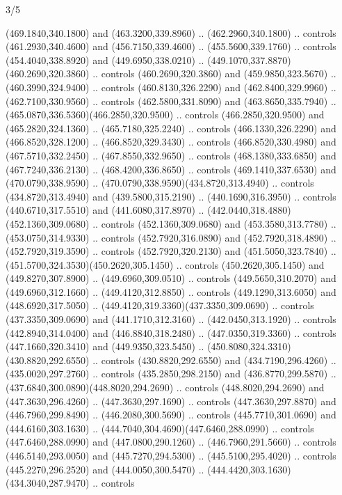 \begin{flagdescription}{3/5}
\begin{scope}[shift={(0.5\flaglength,0.5\flagwidth)},scale=\flagwidth/1075]
\begin{scope}[y=0.80pt, x=0.80pt, yscale=-2.37, xscale=2.37,xshift=-402,yshift=-230.4]
  (469.1840,340.1800) and (463.3200,339.8960) .. (462.2960,340.1800) .. controls
  (461.2930,340.4600) and (456.7150,339.4600) .. (455.5600,339.1760) .. controls
  (454.4040,338.8920) and (449.6950,338.0210) ..
  (449.1070,337.8870)(460.2690,320.3860) .. controls (460.2690,320.3860) and
  (459.9850,323.5670) .. (460.3990,324.9400) .. controls (460.8130,326.2290) and
  (462.8400,329.9960) .. (462.7100,330.9560) .. controls (462.5800,331.8090) and
  (463.8650,335.7940) .. (465.0870,336.5360)(466.2850,320.9500) .. controls
  (466.2850,320.9500) and (465.2820,324.1360) .. (465.7180,325.2240) .. controls
  (466.1330,326.2290) and (466.8520,328.1200) .. (466.8520,329.3430) .. controls
  (466.8520,330.4980) and (467.5710,332.2450) .. (467.8550,332.9650) .. controls
  (468.1380,333.6850) and (467.7240,336.2130) .. (468.4200,336.8650) .. controls
  (469.1410,337.6530) and (470.0790,338.9590) ..
  (470.0790,338.9590)(434.8720,313.4940) .. controls (434.8720,313.4940) and
  (439.5800,315.2190) .. (440.1690,316.3950) .. controls (440.6710,317.5510) and
  (441.6080,317.8970) .. (442.0440,318.4880)(452.1360,309.0680) .. controls
  (452.1360,309.0680) and (453.3580,313.7780) .. (453.0750,314.9330) .. controls
  (452.7920,316.0890) and (452.7920,318.4890) .. (452.7920,319.3590) .. controls
  (452.7920,320.2130) and (451.5050,323.7840) ..
  (451.5700,324.3530)(450.2620,305.1450) .. controls (450.2620,305.1450) and
  (449.8270,307.8900) .. (449.6960,309.0510) .. controls (449.5650,310.2070) and
  (449.6960,312.1660) .. (449.4120,312.8850) .. controls (449.1290,313.6050) and
  (448.6920,317.5050) .. (449.4120,319.3360)(437.3350,309.0690) .. controls
  (437.3350,309.0690) and (441.1710,312.3160) .. (442.0450,313.1920) .. controls
  (442.8940,314.0400) and (446.8840,318.2480) .. (447.0350,319.3360) .. controls
  (447.1660,320.3410) and (449.9350,323.5450) ..
  (450.8080,324.3310)(430.8820,292.6550) .. controls (430.8820,292.6550) and
  (434.7190,296.4260) .. (435.0020,297.2760) .. controls (435.2850,298.2150) and
  (436.8770,299.5870) .. (437.6840,300.0890)(448.8020,294.2690) .. controls
  (448.8020,294.2690) and (447.3630,296.4260) .. (447.3630,297.1690) .. controls
  (447.3630,297.8870) and (446.7960,299.8490) .. (446.2080,300.5690) .. controls
  (445.7710,301.0690) and (444.6160,303.1630) ..
  (444.7040,304.4690)(447.6460,288.0990) .. controls (447.6460,288.0990) and
  (447.0800,290.1260) .. (446.7960,291.5660) .. controls (446.5140,293.0050) and
  (445.7270,294.5300) .. (445.5100,295.4020) .. controls (445.2270,296.2520) and
  (444.0050,300.5470) .. (444.4420,303.1630)(434.3040,287.9470) .. controls

\end{scope}
\end{scope}
\end{flagdescription}
